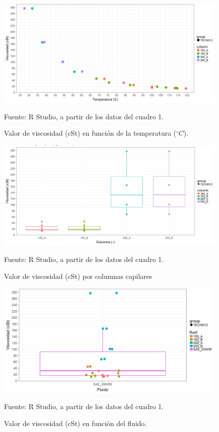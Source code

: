 \documentclass[12, letterpaper]{article}
\begin{document}
\begin{landscape}

\begin{figure}[H]
	\centering
	\includegraphics[width=1\columnwidth]{figura_1.png}
	\caption{Valor de viscosidad (cSt) en función de la temperatura ($^{\circ}C$).}
	Fuente: R Studio, a partir de los datos del cuadro 1.
    \label{figura1}
\end{figure}

\begin{figure}[H]
	\centering
	\includegraphics[width=1\columnwidth]{figura_2.png}
	\caption{Valor de viscosidad (cSt) por columnas capilares}
    Fuente: R Studio, a partir de los datos del cuadro 1.
    \label{figura2}
\end{figure}

\begin{figure}[H]
	\centering
	\includegraphics[width=1\columnwidth]{figura_3.png}
	\caption{Valor de viscosidad (cSt) en función del fluido.}
	Fuente: R Studio, a partir de los datos del cuadro 1.
    \label{figura3}
\end{figure}


\end{landscape}
\end{document}
